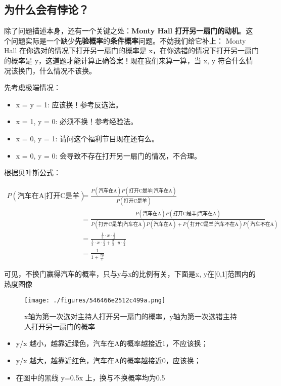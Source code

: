 \subsection{为什么会有悖论？}
除了问题描述本身，还有一个关键之处：\textbf{Monty Hall 打开另一扇门的动机}。这个问题实际是一个缺少\textbf{先验概率}的\textbf{条件概率}问题。不妨我们给它补上： Monty Hall 在你选对的情况下打开另一扇门的概率是 x，在你选错的情况下打开另一扇门的概率是 y，这道题才能计算正确答案！现在我们来算一算，当 x, y 符合什么情况该换门，什么情况不该换。

先考虑极端情况：

\begin{itemize}
\item x = y = 1: 应该换！参考反选法。
\item x = 1, y = 0: 必须不换！参考经验法。
\item x = 0, y = 1: 请问这个福利节目现在还有么。
\item x = 0, y = 0: 会导致不存在打开另一扇门的情况，不合理。
\end{itemize}

根据贝叶斯公式：

\begin{align}
\nonumber
P(\text{汽车在A}|\text{打开C是羊})&=\frac{P(\text{汽车在A})P(\text{打开C是羊}|\text{汽车在A})}{P(\text{打开C是羊})}\\
\nonumber
&=\frac{P(\text{汽车在A})P(\text{打开C是羊}|\text{汽车在A})}{P(\text{打开C是羊}|\text{汽车在A})P(\text{汽车在A})+P(\text{打开C是羊}|\text{汽车不在A})P(\text{汽车不在A})}\\
\nonumber
&=\frac{\frac{1}{3}\cdot x\cdot \frac{1}{2}}{\frac{1}{3}\cdot x\cdot \frac{1}{2}+\frac{2}{3}\cdot y\cdot \frac{1}{2}}\\
\nonumber
&=\frac{1}{1+\frac{2y}{x}}
\end{align}

可见，不换门赢得汽车的概率，只与y与x的比例有关，下面是x, y在[0,1]范围内的热度图像

\begin{figure}[ht]
\centering
\texttt{[image: ./figures/546466e2512c499a.png]}
\caption{x轴为第一次选对主持人打开另一扇门的概率，y轴为第一次选错主持人打开另一扇门的概率} \label {fig_MontyH}
\end{figure}

\begin{itemize}
\item y/x 越小，越靠近绿色，汽车在A的概率越接近1，不应该换；
\item y/x 越大，越靠近红色，汽车在A的概率越接近0，应该换；
\item 在图中的黑线 y=0.5x 上，换与不换概率均为0.5
\end{itemize}

